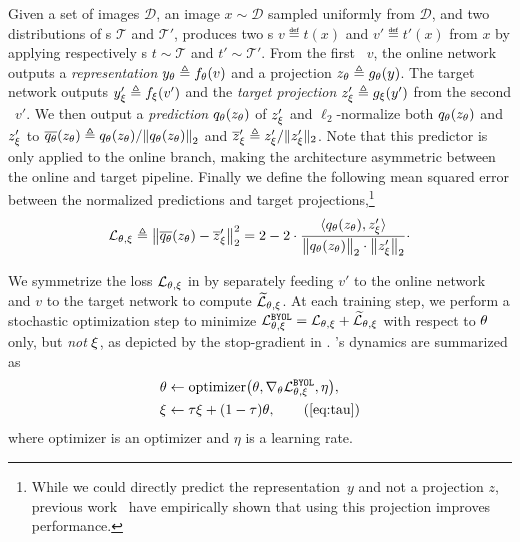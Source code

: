 Given a set of images $\mathcal{D}$, an image $x \sim \mathcal{D}$ sampled uniformly from $\mathcal{D}$, and two distributions of \imageaugmentation s $\mathcal{T}$ and $\mathcal{T}'$, \algo produces two \augview s $v \eqdef t(x)$ and $v'\eqdef t'(x)$ from $x$ by applying respectively \imageaugmentation s $t\sim \mathcal{T}$ and $t'\sim \mathcal{T}'$. From the first \augview~$v$, the online network outputs a \emph{representation} $y_{\theta} \triangleq f_{\theta}(v)$ and a projection $z_{\theta} \triangleq g_{\theta}(y)$. The target network outputs $y'_\xi \triangleq f_\xi(v')$ and the \emph{target projection} $z'_\xi \triangleq g_\xi (y')$ from the second \augview~$v'$. We then output a \emph{prediction} $q_{\theta}(z_{\theta})$ of $z'_\xi$ and $\ell_2$-normalize both $q_{\theta}(z_{\theta})$ and $z'_\xi$ to $\bar{q_\netparams}(z_\netparams) \eqdef q_\netparams(z_\netparams)/\normtwo{q_\netparams(z_\netparams)}$ and $\overline{z}'_\xi \triangleq z'_\xi / \|z'_\xi\|_2$.  Note that this predictor is only applied to the online branch, making the architecture asymmetric between the online and target pipeline. Finally we define the following mean squared error between the normalized predictions and target projections,\footnote{While we could directly predict the representation~$y$ and not a projection $z$, previous work~\cite{SimCLR} have empirically shown that using this projection improves performance.}
\begin{equation}
    \mathcal{L}_{\netparams, \targetparams} \eqdef \normtwo{\bar{q_{\theta}}(z_\netparams) - \bar{z}'_\targetparams}^2 = 2 - 2\cdot\frac{\langle q_\netparams(z_\netparams),  z'_\targetparams \rangle }{\big\|q_\netparams(z_\netparams)\big\|_2\cdot
    \big\|z'_\targetparams\big\|_2
    }
    \cdot
    \label{eq:cosine-loss}
\end{equation}

We symmetrize the loss $\mathcal{L}_{{\theta}, \xi}$ in  by separately feeding $v'$ to the online network and $v$ to the target network to compute $\widetilde{\mathcal{L}}_{{\theta}, \xi}$. At each training step, we perform a stochastic optimization step to minimize $\mathcal{L}^\texttt{BYOL}_{{\theta}, \xi} = \mathcal{L}_{{\theta}, \xi} + \widetilde{\mathcal{L}}_{{\theta}, \xi}$ with respect to ${\theta}$ only, but \textit{not} $\xi$, as depicted by the stop-gradient in . \algo's dynamics are summarized as
\begin{align}
&\netparams \leftarrow \mathrm{optimizer} \left(\netparams, \nabla_\netparams \mathcal{L}^\algo_{\netparams, \targetparams}, \eta \right),
\\
&\targetparams \leftarrow \tau \targetparams + (1 - \tau) \netparams,  \tag{\ref{eq:tau}}
\end{align}
where $\mathrm{optimizer}$ is an optimizer and $\eta$ is a learning rate.

